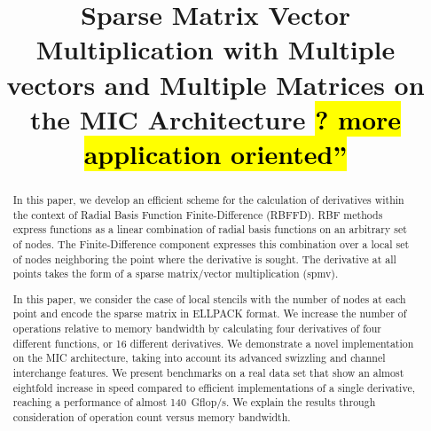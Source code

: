 \documentclass[10pt,conference,compsocconf]{IEEEtran}
\newcommand{\todo}[1]{{\color{red}\textbf{\hl{#1}}\xspace}}
\begin{document}
\title{Sparse Matrix Vector Multiplication with Multiple vectors and
  Multiple Matrices on the MIC Architecture \todo{? more application oriented''}}


\author{
}
\maketitle


\begin{abstract}
In this paper, we develop an efficient scheme for the calculation of
derivatives within the context of Radial Basis Function
Finite-Difference (RBFFD). RBF methods express functions as a linear
combination of radial basis functions on an arbitrary set of
nodes. The Finite-Difference component expresses this combination over
a local set of nodes neighboring the point where the derivative is
sought.  The derivative at all points takes the form of a sparse
matrix/vector multiplication (spmv).

In this paper, we consider the case of local stencils with the number
of nodes at each point and encode the sparse matrix in ELLPACK
format. We increase the number of operations relative to memory
bandwidth by calculating four derivatives of four different functions,
or 16 different derivatives. We demonstrate a novel implementation on
the MIC architecture, taking into account its advanced swizzling and
channel interchange features. We present benchmarks on a real data
set that show an almost eightfold increase in speed compared to
efficient implementations of a single derivative, reaching a
performance of almost 140~Gflop/s. We explain the results through
consideration of operation count versus memory bandwidth.
\end{abstract}
\end{document}
